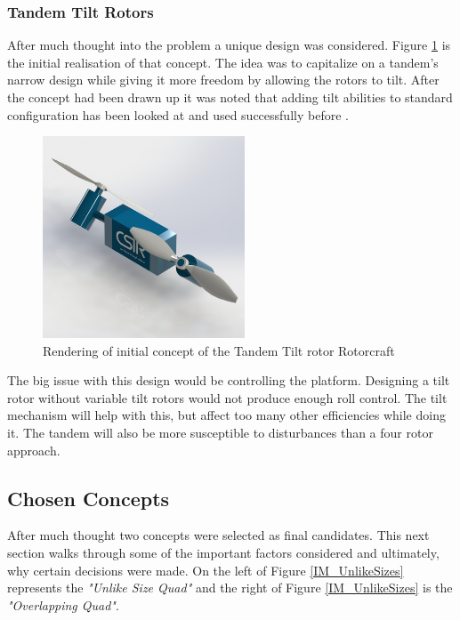 \subsubsection{Tandem Tilt Rotors}
After much thought into the problem a unique design was considered. Figure \ref{IM_TiltTandem} is the initial realisation of that concept. The idea was to capitalize on a tandem's narrow design while giving it more freedom by allowing the rotors to tilt. After the concept had been drawn up it was noted that adding tilt abilities to standard configuration has been looked at and used successfully before \cite{TandemTiltRotor, TripleTiltRotor}.

\begin{figure}[H]
\centering
\includegraphics[height = 6cm]{Images/Design/Tandem}
\caption{Rendering of initial concept of the Tandem Tilt rotor Rotorcraft}
\label{IM_TiltTandem}
\end{figure}

The big issue with this design would be controlling the platform. Designing a tilt rotor without variable tilt rotors would not produce enough roll control. The tilt mechanism will help with this, but affect too many other efficiencies while doing it. The tandem will also be more susceptible to disturbances than a four rotor approach.

\subsection{Chosen Concepts}

After much thought two concepts were selected as final candidates. This next section walks through some of the important factors considered and ultimately, why certain decisions were made. 
On the left of Figure \ref{IM_UnlikeSizes} represents the \textit{"Unlike Size Quad"} and the right of Figure \ref{IM_UnlikeSizes} is the \textit{"Overlapping Quad"}. 

